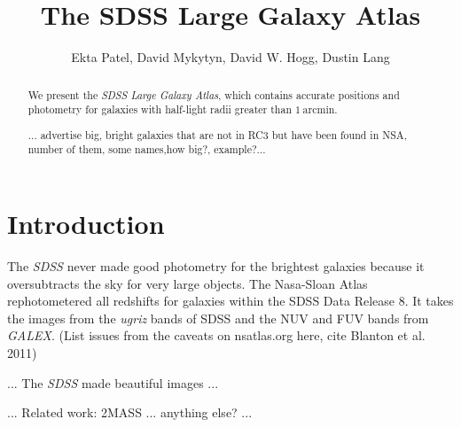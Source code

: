 \documentclass[12pt,preprint,dvipdf]{aastex}
\newcounter{address}
\newcommand{\project}[1]{\textsl{#1}}
\newcommand{\units}[1]{\mathrm{#1}}
\renewcommand{\arcmin}{\units{arcmin}}
\begin{document}
\title{
       The SDSS Large Galaxy Atlas
      }
\author{
        Ekta Patel\altaffilmark{\ref{CCPP}},
        David Mykytyn\altaffilmark{\ref{CCPP}},
        David W. Hogg\altaffilmark{\ref{CCPP},\ref{MPIA},\ref{email}},
        Dustin Lang\altaffilmark{\ref{CMU}}
       }
\setcounter{address}{1}

\begin{abstract}
We present the \project{SDSS Large Galaxy Atlas}, which contains
accurate positions and photometry for galaxies with half-light radii
greater than $1~\arcmin$.


... advertise big, bright galaxies that are not in RC3 but have been found in NSA, number of them, some names,how big?, example?...
\end{abstract}

\section{Introduction}

The \project{SDSS} never made good photometry for the brightest galaxies because it oversubtracts the sky for very large objects. The Nasa-Sloan Atlas rephotometered all redshifts for galaxies within the SDSS Data Release 8. It takes the images from the \textit{ugriz} bands of SDSS and the NUV and FUV bands from \textit{GALEX}. (List issues from the caveats on nsatlas.org here, cite Blanton et al. 2011)

... The \project{SDSS} made beautiful images ...

... Related work:  2MASS ... anything else? ...
\end{document}
